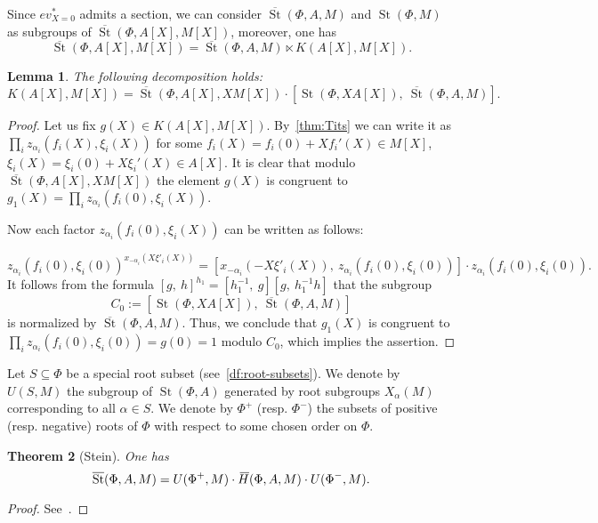 \documentclass[oneside, 8pt]{amsart}
\newtheorem{lemma}{Lemma}
\newtheorem{externaltheorem}[lemma]{Theorem}
\theoremstyle{remark}
\theoremstyle{definition}
\numberwithin{lemma}{section}
\numberwithin{prop}{section}
\numberwithin{corollary}{section}
\numberwithin{externaltheorem}{section}
\DeclareMathOperator{\St}{St}
\newcommand{\myol}[2][3]{{}\mkern#1mu\overline{\mkern-#1mu#2}}
\numberwithin{equation}{section}
\begin{document}
Since $ev_{X=0}^*$ admits a section, we can consider $\overline{\St}(\Phi, A, M)$ and $\St(\Phi, M)$ as subgroups of $\overline{\St}(\Phi, A[X], M[X])$,
 moreover, one has 
\begin{equation} \label{eq:sd-decomp} \overline{\St}(\Phi, A[X], M[X]) = \overline{\St}(\Phi, A, M) \ltimes K(A[X], M[X]).\end{equation}
\begin{lemma} \label{Kdecomp1} The following decomposition holds:
 \[ K(A[X], M[X]) = \overline{\St}(\Phi, A[X], XM[X]) \cdot \left[\St(\Phi, XA[X]),\ \overline{\St}(\Phi, A, M)\right].\] \end{lemma}
\begin{proof} Let us fix $g(X) \in K(A[X], M[X])$. By~\cref{thm:Tits} we can write it as $\prod_i z_{\alpha_i}(f_i(X), \xi_i(X))$ for some $f_i(X) = f_i(0) + Xf_i'(X) \in M[X]$, $\xi_i(X) = \xi_i(0) + X\xi_i'(X) \in A[X]$.
 It is clear that modulo $\overline{\St}(\Phi, A[X], XM[X])$ the element $g(X)$ is congruent to $g_1(X) = \prod_i z_{\alpha_i}(f_i(0), \xi_i(X)).$ 
 
 Now each factor $z_{\alpha_i}(f_i(0), \xi_i(X))$ can be written as follows: 

 \[z_{\alpha_i}(f_i(0), \xi_i(0))^{x_{-\alpha_i}(X\xi'_i(X))} = [x_{-\alpha_i}(-X\xi'_i(X)),\ z_{\alpha_i}(f_i(0), \xi_i(0))] \cdot z_{\alpha_i}(f_i(0), \xi_i(0)).\]
 It follows from the formula $[g,\ h]^{h_1} = [h_1^{-1},\ g][g,\ h_1^{-1}h]$ that the subgroup \[C_0 := \left[\St(\Phi, XA[X]),\ \overline{\St}(\Phi, A, M)\right]\] is normalized by $\overline{\St}(\Phi, A, M)$. Thus, we conclude that $g_1(X)$ is congruent to $\prod_i z_{\alpha_i}(f_i(0), \xi_i(0)) = g(0) = 1$ modulo $C_0$,
 which implies the assertion. \qedhere \end{proof}

Let $S \subseteq \Phi$ be a special root subset (see~\cref{df:root-subsets}). We denote by $U(S, M)$ the subgroup of $\St(\Phi, A)$ generated by root subgroups $X_\alpha(M)$ corresponding to all $\alpha \in S$. We denote by $\Phi^+$ (resp. $\Phi^-$) the subsets of positive (resp. negative) roots of $\Phi$ with respect to some chosen order on $\Phi$.
 
\begin{externaltheorem}[Stein] \label{thm:Stein} One has \[\overline{\St}(\Phi, A, M) = U(\Phi^+, M) \cdot \myol{H}(\Phi, A, M) \cdot U(\Phi^-, M).\] \end{externaltheorem} \begin{proof} See~\cite[Theorem~2.4]{Ste73}. \end{proof}
\end{document}
